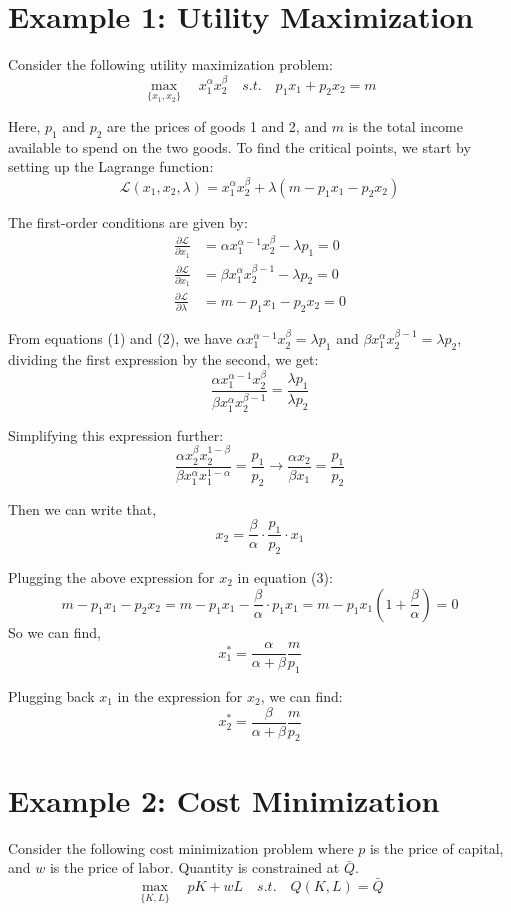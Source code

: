 \documentclass{./../Latex/handout}
\begin{document}
\thispagestyle{plain}
\newcommand{\mytitle}{Optimization Examples}
\myheader{\mytitle}

\section*{Example 1: Utility Maximization}
Consider the following utility maximization problem:$$ \max_{\{x_1,x_2\}} \quad x_1^{\alpha} x_2^{\beta} \quad s.t. \quad p_1 x_1 + p_2 x_2 = m $$
 
 Here, $p_1$ and $p_2$ are the prices of goods 1 and 2, and $m$ is the total income available to spend on the two goods. 
 To find the critical points, we start by setting up the Lagrange function: 
  $$ \mathcal{L}(x_1,x_2,\lambda) =  x_1^{\alpha} x_2^{\beta} + \lambda(m-p_1 x_1-p_2 x_2)$$
  
The first-order conditions are given by:
\begin{align}
	\frac{\partial \mathcal{L}}{\partial x_1} &= \alpha x_1^{\alpha-1}x_2^{\beta}-\lambda p_1 = 0 \\ 
	 \frac{\partial \mathcal{L}}{\partial x_1} &= \beta x_1^{\alpha}x_2^{\beta-1}-\lambda p_2 = 0 \\
	  \frac{\partial \mathcal{L}}{\partial \lambda} &= m-p_1 x_1-p_2 x_2 = 0 
\end{align}

From equations (1) and (2), we have $\alpha x_1^{\alpha-1}x_2^{\beta}=\lambda p_1 $ and  $\beta x_1^{\alpha}x_2^{\beta-1}=\lambda p_2$, dividing the first expression by the second, we get:
$$ \frac{\alpha x_1^{\alpha-1}x_2^{\beta}}{\beta x_1^{\alpha}x_2^{\beta-1}} = \frac{\lambda p_1}{\lambda p_2}$$

Simplifying this expression further:
$$ \frac{\alpha x_2^{\beta}x_2^{1-\beta}}{\beta x_1^{\alpha}x_1^{1-\alpha}} = \frac{ p_1}{ p_2} \rightarrow \frac{\alpha x_2}{\beta x_1} = \frac{p_1}{p_2} $$

Then we can write that, 
$$ x_2 = \frac{\beta}{\alpha}\cdot\frac{p_1}{p_2} \cdot x_1$$

Plugging the above expression for $x_2$  in equation (3):
$$ m-p_1 x_1-p_2 x_2 = m-p_1 x_1- \frac{\beta}{\alpha}\cdot p_1 x_1 = m-p_1 x_1\left(1+ \frac{\beta}{\alpha}\right) =0  $$
So we can find, $$x^*_1 = \frac{\alpha}{\alpha+\beta}\frac{m}{p_1}$$

Plugging back $x_1$ in the expression for $x_2$, we can find:
$$x^*_2 = \frac{\beta}{\alpha+\beta}\frac{m}{p_2}$$ 

\section*{Example 2: Cost Minimization}
Consider the following cost minimization problem where $p$ is the price of capital, and $w$ is the price of labor. Quantity is constrained at $\bar{Q}$. 
$$ \max_{\{K,L\}} \quad p K + w L \quad s.t. \quad Q(K,L) = \bar{Q} $$
\end{document}
